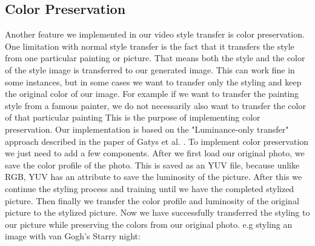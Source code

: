 \subsection{Color Preservation}
Another feature we implemented in our video style transfer is color preservation. One limitation with normal style transfer is the fact that it transfers the style from one particular painting or picture. That means both the style and the color of the style image is transferred to our generated image. This can work fine in some instances, but in some cases we want to transfer only the styling and keep the original color of our image. For example if we want to transfer the painting style from a famous painter, we do not necessarily also want to transfer the color of that particular painting This is the purpose of implementing color preservation.\newline\newline
Our implementation is based on the "Luminance-only transfer" approach described in the paper of Gatys et al. \cite{Gatys:2}. To implement color preservation we just need to add a few components. After we first load our original photo, we save the color profile of the photo. This is saved as an YUV file, because unlike RGB, YUV has an attribute to save the luminosity of the picture. After this we continue the styling process and training until we have the completed stylized picture. Then finally we transfer the color profile and luminosity of the original picture to the stylized picture. Now we have successfully transferred the styling to our picture while preserving the colors from our original photo.\newline
e.g styling an image with van Gogh's Starry night:\newline
